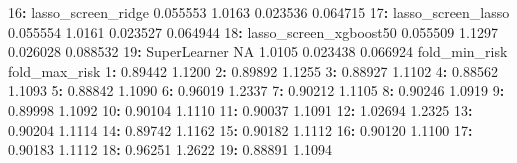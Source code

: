 \documentclass[12pt, krantz2,]{krantz}
\newenvironment{Shaded}{\begin{snugshade}}{\end{snugshade}}
\newcommand{\DecValTok}[1]{\textcolor[rgb]{0.06,0.06,0.06}{#1}}
\newcommand{\FloatTok}[1]{\textcolor[rgb]{0.06,0.06,0.06}{#1}}
\newcommand{\NormalTok}[1]{#1}
\newcommand{\OperatorTok}[1]{\textcolor[rgb]{0.43,0.43,0.43}{\textbf{#1}}}
\newcommand{\OtherTok}[1]{\textcolor[rgb]{0.37,0.37,0.37}{#1}}
\newcommand{\StringTok}[1]{\textcolor[rgb]{0.5,0.5,0.5}{#1}}
\theoremstyle{definition}
\theoremstyle{definition}
\theoremstyle{definition}
\newcommand{\1}{\mathbbm{1}}
\begin{document}
\begin{Shaded}
\begin{Highlighting}[]
\DecValTok{16}\OperatorTok{:}\StringTok{            }\NormalTok{lasso_screen_ridge     }\FloatTok{0.055553} \FloatTok{1.0163} \FloatTok{0.023536} \FloatTok{0.064715}
\DecValTok{17}\OperatorTok{:}\StringTok{            }\NormalTok{lasso_screen_lasso     }\FloatTok{0.055554} \FloatTok{1.0161} \FloatTok{0.023527} \FloatTok{0.064944}
\DecValTok{18}\OperatorTok{:}\StringTok{        }\NormalTok{lasso_screen_xgboost50     }\FloatTok{0.055509} \FloatTok{1.1297} \FloatTok{0.026028} \FloatTok{0.088532}
\DecValTok{19}\OperatorTok{:}\StringTok{                  }\NormalTok{SuperLearner           }\OtherTok{NA} \FloatTok{1.0105} \FloatTok{0.023438} \FloatTok{0.066924}
\NormalTok{    fold_min_risk fold_max_risk}
 \DecValTok{1}\OperatorTok{:}\StringTok{       }\FloatTok{0.89442}        \FloatTok{1.1200}
 \DecValTok{2}\OperatorTok{:}\StringTok{       }\FloatTok{0.89892}        \FloatTok{1.1255}
 \DecValTok{3}\OperatorTok{:}\StringTok{       }\FloatTok{0.88927}        \FloatTok{1.1102}
 \DecValTok{4}\OperatorTok{:}\StringTok{       }\FloatTok{0.88562}        \FloatTok{1.1093}
 \DecValTok{5}\OperatorTok{:}\StringTok{       }\FloatTok{0.88842}        \FloatTok{1.1090}
 \DecValTok{6}\OperatorTok{:}\StringTok{       }\FloatTok{0.96019}        \FloatTok{1.2337}
 \DecValTok{7}\OperatorTok{:}\StringTok{       }\FloatTok{0.90212}        \FloatTok{1.1105}
 \DecValTok{8}\OperatorTok{:}\StringTok{       }\FloatTok{0.90246}        \FloatTok{1.0919}
 \DecValTok{9}\OperatorTok{:}\StringTok{       }\FloatTok{0.89998}        \FloatTok{1.1092}
\DecValTok{10}\OperatorTok{:}\StringTok{       }\FloatTok{0.90104}        \FloatTok{1.1110}
\DecValTok{11}\OperatorTok{:}\StringTok{       }\FloatTok{0.90037}        \FloatTok{1.1091}
\DecValTok{12}\OperatorTok{:}\StringTok{       }\FloatTok{1.02694}        \FloatTok{1.2325}
\DecValTok{13}\OperatorTok{:}\StringTok{       }\FloatTok{0.90204}        \FloatTok{1.1114}
\DecValTok{14}\OperatorTok{:}\StringTok{       }\FloatTok{0.89742}        \FloatTok{1.1162}
\DecValTok{15}\OperatorTok{:}\StringTok{       }\FloatTok{0.90182}        \FloatTok{1.1112}
\DecValTok{16}\OperatorTok{:}\StringTok{       }\FloatTok{0.90120}        \FloatTok{1.1100}
\DecValTok{17}\OperatorTok{:}\StringTok{       }\FloatTok{0.90183}        \FloatTok{1.1112}
\DecValTok{18}\OperatorTok{:}\StringTok{       }\FloatTok{0.96251}        \FloatTok{1.2622}
\DecValTok{19}\OperatorTok{:}\StringTok{       }\FloatTok{0.88891}        \FloatTok{1.1094}
\end{Highlighting}
\end{Shaded}
\end{document}
